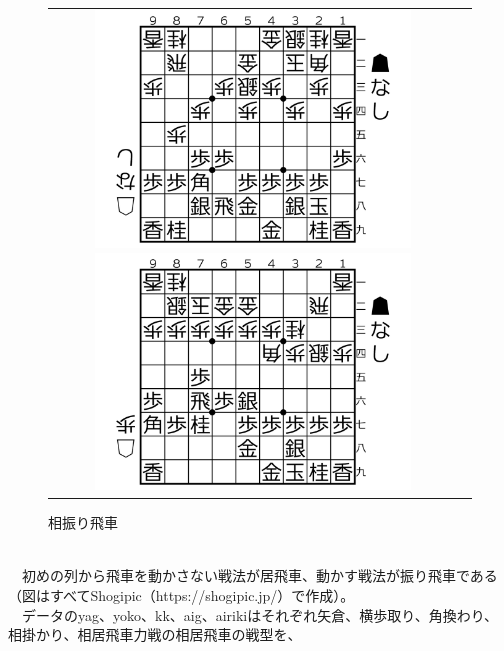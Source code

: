 \documentclass[11pt,a4paper,dvipdfmx]{jsarticle}
\begin{document}
\\
\begin{figure}[h]
    \begin{tabular}{cc}
        \begin{minipage}[t]{0.47\hsize}
            \centering
            \includegraphics[width=0.8\textwidth]{graph/taikou.png}
            \caption{対抗系}
        \end{minipage}
        \begin{minipage}[t]{0.47\hsize}
            \centering
            \includegraphics[width=0.8\textwidth]{graph/aifuri.png}
            \caption{相振り飛車}
        \end{minipage}
    \end{tabular}
\end{figure}
\\
　初めの列から飛車を動かさない戦法が居飛車、動かす戦法が振り飛車である（図はすべてShogipic（https://shogipic.jp/）で作成）。
\\
　データのyag、yoko、kk、aig、airikiはそれぞれ矢倉、横歩取り、角換わり、相掛かり、相居飛車力戦の相居飛車の戦型を、
\end{document}
